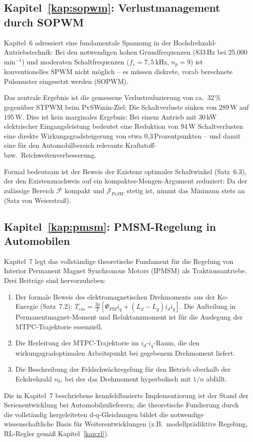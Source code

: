 ﻿\documentclass[a4paper,12pt,openany,oneside]{book}
\newcommand{\unterabschnitt}[1]{\subsection{#1}}
\theoremstyle{definition}
\begin{document}
\unterabschnitt{Kapitel~\ref{kap:sopwm}: Verlustmanagement durch SOPWM}

Kapitel~6 adressiert eine fundamentale Spannung in der Hochdrehzahl-Antriebstechnik:
Bei den notwendigen hohen Grundfrequenzen (833\,Hz bei 25.000\,min$^{-1}$) und
moderaten Schaltfrequenzen ($f_s = 7{,}5\,\mathrm{kHz}$, $n_p = 9$) ist konventionelles
SPWM nicht m\"oglich -- es m\"ussen diskrete, vorab berechnete Pulsmuster eingesetzt
werden (SOPWM).

Das zentrale Ergebnis ist die gemessene Verlustreduzierung von ca.\ $32\,\%$ gegen\"uber
STPWM beim PvSWmin-Ziel: Die Schaltverluste sinken von 289\,W auf 195\,W. Dies ist
kein marginales Ergebnis: Bei einem Antrieb mit 30\,kW elektrischer Eingangsleistung
bedeutet eine Reduktion von 94\,W Schaltverlusten eine direkte Wirkungsgrad\-steigerung
von etwa 0{,}3\,Prozentpunkten -- und damit eine f\"ur den Automobilbereich relevante
Kraftstoff- bzw.\ Reichweitenverbesserung.

Formal bedeutsam ist der Beweis der Existenz optimaler Schaltwinkel (Satz~6.3),
der den Existenznachweis auf ein kompaktes-Mengen-Argument reduziert: Da der
zul\"assige Bereich $\mathcal{F}$ kompakt und $\mathcal{J}_{PvSW}$ stetig ist,
nimmt das Minimum stets an (Satz von Weierstra\ss{}).

\unterabschnitt{Kapitel~\ref{kap:pmsm}: PMSM-Regelung in Automobilen}

Kapitel~7 legt das vollst\"andige theoretische Fundament f\"ur die Regelung von
Interior Permanent Magnet Synchronous Motors (IPMSM) als Traktionsantriebe. Drei
Beitr\"age sind hervorzuheben:

\begin{enumerate}
  \item Der formale Beweis des elektromagnetischen Drehmoments aus der Ko-Energie
    (Satz~7.2): $T_{em} = \frac{3p}{2}[\Psi_{PM} i_q + (L_d-L_q) i_d i_q]$.
    Die Aufteilung in Permanent\-magnet-Moment und Reluktanzmoment ist f\"ur die
    Auslegung der MTPC-Trajektorie essenziell.
  \item Die Herleitung der MTPC-Trajektorie im $i_d$-$i_q$-Raum, die den
    wirkungsgradoptimalen Arbeitspunkt bei gegebenem Drehmoment liefert.
  \item Die Beschreibung der Feldschwächregelung f\"ur den Betrieb oberhalb der
    Eckdrehzahl $n_b$, bei der das Drehmoment hyperbolisch mit $1/n$ abf\"allt.
\end{enumerate}

Die in Kapitel~7 beschriebene kennfeldbasierte Implementierung ist der Stand der
Serienentwicklung bei Automobilzulieferern; die theoretische Fundierung durch die
vollst\"andig hergeleiteten d-q-Gleichungen bildet die notwendige wissenschaftliche
Basis f\"ur Weiterentwicklungen (z.B.\ modellpr\"adiktive Regelung, RL-Regler gem\"a\ss{}
Kapitel~\ref{kap:rl}).
\end{document}
